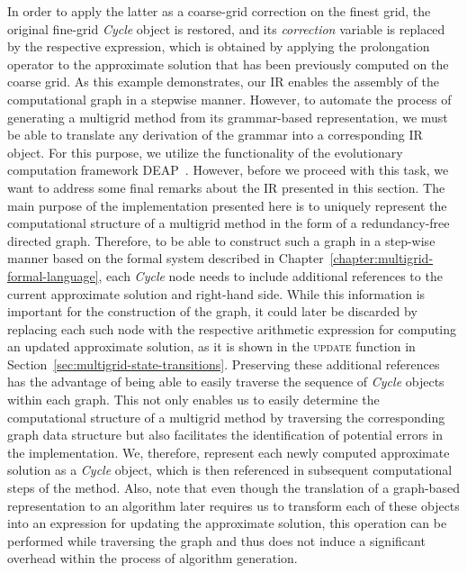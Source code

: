 In order to apply the latter as a coarse-grid correction on the finest grid, the original fine-grid \emph{Cycle} object is restored, and its \emph{correction} variable is replaced by the respective expression, which is obtained by applying the prolongation operator to the approximate solution that has been previously computed on the coarse grid.
As this example demonstrates, our IR enables the assembly of the computational graph in a stepwise manner.
However, to automate the process of generating a multigrid method from its grammar-based representation, we must be able to translate any derivation of the grammar into a corresponding IR object.
For this purpose, we utilize the functionality of the evolutionary computation framework DEAP~\cite{rainville2012deap}.
However, before we proceed with this task, we want to address some final remarks about the IR presented in this section.
The main purpose of the implementation presented here is to uniquely represent the computational structure of a multigrid method in the form of a redundancy-free directed graph.
Therefore, to be able to construct such a graph in a step-wise manner based on the formal system described in Chapter~\ref{chapter:multigrid-formal-language}, each \emph{Cycle} node needs to include additional references to the current approximate solution and right-hand side.
While this information is important for the construction of the graph, it could later be discarded by replacing each such node with the respective arithmetic expression for computing an updated approximate solution, as it is shown in the \textsc{update} function in Section~\ref{sec:multigrid-state-transitions}.
Preserving these additional references has the advantage of being able to easily traverse the sequence of \emph{Cycle} objects within each graph.
This not only enables us to easily determine the computational structure of a multigrid method by traversing the corresponding graph data structure but also facilitates the identification of potential errors in the implementation.
We, therefore, represent each newly computed approximate solution as a \emph{Cycle} object, which is then referenced in subsequent computational steps of the method.
Also, note that even though the translation of a graph-based representation to an algorithm later requires us to transform each of these objects into an expression for updating the approximate solution, this operation can be performed while traversing the graph and thus does not induce a significant overhead within the process of algorithm generation.

